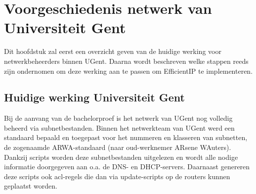 
\chapter{Voorgeschiedenis netwerk van Universiteit Gent}%
\label{ch:voorgeschiedenis}
Dit hoofdstuk zal eerst een overzicht geven van de huidige werking voor netwerkbeheerders binnen UGent.
Daarna wordt beschreven welke stappen reeds zijn ondernomen om deze werking aan te passen om EfficientIP te implementeren.

\section{Huidige werking Universiteit Gent}
Bij de aanvang van de bachelorproef is het netwerk van UGent nog volledig beheerd via subnetbestanden. Binnen het netwerkteam van UGent werd een standaard bepaald en toegepast voor het nummeren en klasseren van subnetten, de zogenaamde ARWA-standaard (naar oud-werknemer ARsene WAuters). Dankzij scripts worden deze subnetbestanden uitgelezen en wordt alle nodige informatie doorgegeven aan o.a. de DNS- en DHCP-servers. Daarnaast genereren deze scripts ook \acrfull{acl}-regels die dan via update-scripts op de routers kunnen geplaatst worden.

